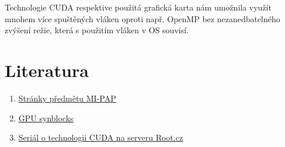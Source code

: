 \documentclass[12pt]{article}
\begin{document}
Technologie CUDA respektive použitá grafická karta nám umožnila využít mnohem více spuštěných vláken oproti např. OpenMP bez nezanedbatelného zvýšení režie, která s použitím vláken v OS souvisí. 
\section{Literatura}
\begin{enumerate}
\item \href{https://edux.fit.cvut.cz/courses/MI-PAP}{Stránky předmětu MI-PAP}
\item \href{http://aggregate.org/MAGIC/#GPU SyncBlocks}{\label{cud:synblocks}GPU synblocks}
\item \href{http://www.root.cz/serialy/uvod-do-technologie-cuda/}{Seriál o technologii CUDA na serveru Root.cz}
\end{enumerate}
\end{document}
